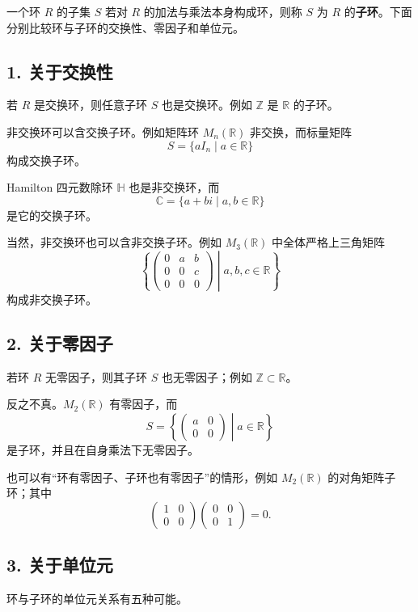 一个环 $R$ 的子集 $S$ 若对 $R$ 的加法与乘法本身构成环，则称 $S$ 为 $R$ 的\textbf{子环}。下面分别比较环与子环的交换性、零因子和单位元。

\subsection*{1. 关于交换性}

若 $R$ 是交换环，则任意子环 $S$ 也是交换环。例如 $\mathbb Z$ 是 $\mathbb R$ 的子环。

非交换环可以含交换子环。例如矩阵环 $M_n(\mathbb R)$ 非交换，而标量矩阵
\[
S=\{aI_n\mid a\in\mathbb R\}
\]
构成交换子环。

Hamilton 四元数除环 $\mathbb H$ 也是非交换环，而
\[
\mathbb C=\{a+bi\mid a,b\in\mathbb R\}
\]
是它的交换子环。

当然，非交换环也可以含非交换子环。例如 $M_3(\mathbb R)$ 中全体严格上三角矩阵
\[
\left\{
\begin{pmatrix}
0&a&b\\0&0&c\\0&0&0
\end{pmatrix}
\middle|a,b,c\in\mathbb R
\right\}
\]
构成非交换子环。

\subsection*{2. 关于零因子}

若环 $R$ 无零因子，则其子环 $S$ 也无零因子；例如 $\mathbb Z\subset\mathbb R$。

反之不真。$M_2(\mathbb R)$ 有零因子，而
\[
S=\left\{\begin{pmatrix}a&0\\0&0\end{pmatrix}\middle|a\in\mathbb R\right\}
\]
是子环，并且在自身乘法下无零因子。

也可以有“环有零因子、子环也有零因子”的情形，例如 $M_2(\mathbb R)$ 的对角矩阵子环；其中
\[
\begin{pmatrix}1&0\\0&0\end{pmatrix}
\begin{pmatrix}0&0\\0&1\end{pmatrix}=0.
\]

\subsection*{3. 关于单位元}

环与子环的单位元关系有五种可能。

